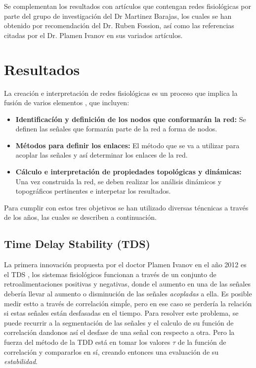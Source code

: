 \documentclass[twoside,twocolumn]{article}
\begin{document}
Se complementan los resultados con artículos que contengan redes fisiológicas por parte del grupo de investigación del Dr Martinez Barajas, los cuales se han obtenido por recomendación del Dr. Ruben Fossion, así como las referencias citadas por el Dr. Plamen Ivanov en sus variados artículos.

\section{Resultados}
La creación e interpretación de redes fisiológicas es un proceso que implica la fusión de varios elementos \cite{barajas2021sex}, que incluyen:
\begin{itemize}
  \item \textbf{Identificacíón y definición de los nodos que conformarán la red:} Se definen las señales que formarán parte de la red a forma de nodos.
  \item \textbf{Métodos para definir los enlaces:} El método que se va a utilizar para acoplar las señales y así determinar los enlaces de la red.
  \item \textbf{Cálculo e interpretación de propiedades topológicas y dinámicas:} Una vez construida la red, se deben realizar los análisis dinámicos y topográficos pertinentes e interpetar los resultados.
\end{itemize}
Para cumplir con estos tres objetivos se han utilizado diversas téncnicas a través de los años, las cuales se describen a continuación.
\subsection{Time Delay Stability (TDS)}
La primera innovación propuesta por el doctor Plamen Ivanov en el año 2012 es el TDS \cite{bashan2012network}, los sistemas fisiológicos funcionan a través de un conjunto de retroalimentaciones positivas y negativas, donde el aumento en una de las señales debería llevar al aumento o disminución de las señales \textit{acopladas} a ella. Es posible medir estto a través de correlación simpĺe, pero en ese caso se perdería la relación si estas señales están desfasadas en el tiempo.
Para resolver este problema, se puede recurrir a la segmentación de las señales y el calculo de su función de correlación dandonos así el desfase de una señal con respecto a otra. Pero la fuerza del método de la TDD está en tomar los valores $\tau$ de la función de correlación y compararlos en sí, creando entonces una evaluación de su \textit{estabilidad}.
\end{document}
